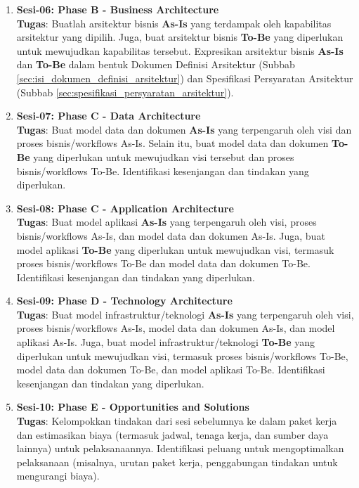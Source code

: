 \begin{enumerate}
	\item \textbf{Sesi-06: Phase B - Business Architecture} \\
	\textbf{Tugas}: Buatlah arsitektur bisnis \textbf{As-Is} yang terdampak oleh kapabilitas arsitektur yang dipilih. Juga, buat arsitektur bisnis \textbf{To-Be} yang diperlukan untuk mewujudkan kapabilitas tersebut. 
	Expresikan arsitektur bisnis \textbf{As-Is} dan \textbf{To-Be} dalam bentuk Dokumen Definisi Arsitektur (Subbab \ref{sec:isi_dokumen_definisi_arsitektur}) dan Spesifikasi Persyaratan Arsitektur (Subbab \ref{sec:spesifikasi_persyaratan_arsitektur}).
	
	\item \textbf{Sesi-07: Phase C - Data Architecture} \\
	\textbf{Tugas}: Buat model data dan dokumen \textbf{As-Is} yang terpengaruh oleh visi dan proses bisnis/workflows As-Is. Selain itu, buat model data dan dokumen \textbf{To-Be} yang diperlukan untuk mewujudkan visi tersebut dan proses bisnis/workflows To-Be. Identifikasi kesenjangan dan tindakan yang diperlukan.
	
	\item \textbf{Sesi-08: Phase C - Application Architecture} \\
	\textbf{Tugas}: Buat model aplikasi \textbf{As-Is} yang terpengaruh oleh visi, proses bisnis/workflows As-Is, dan model data dan dokumen As-Is. Juga, buat model aplikasi \textbf{To-Be} yang diperlukan untuk mewujudkan visi, termasuk proses bisnis/workflows To-Be dan model data dan dokumen To-Be. Identifikasi kesenjangan dan tindakan yang diperlukan.
	
	\item \textbf{Sesi-09: Phase D - Technology Architecture} \\
	\textbf{Tugas}: Buat model infrastruktur/teknologi \textbf{As-Is} yang terpengaruh oleh visi, proses bisnis/workflows As-Is, model data dan dokumen As-Is, dan model aplikasi As-Is. Juga, buat model infrastruktur/teknologi \textbf{To-Be} yang diperlukan untuk mewujudkan visi, termasuk proses bisnis/workflows To-Be, model data dan dokumen To-Be, dan model aplikasi To-Be. Identifikasi kesenjangan dan tindakan yang diperlukan.
	
	\item \textbf{Sesi-10: Phase E - Opportunities and Solutions} \\
	\textbf{Tugas}: Kelompokkan tindakan dari sesi sebelumnya ke dalam paket kerja dan estimasikan biaya (termasuk jadwal, tenaga kerja, dan sumber daya lainnya) untuk pelaksanaannya. Identifikasi peluang untuk mengoptimalkan pelaksanaan (misalnya, urutan paket kerja, penggabungan tindakan untuk mengurangi biaya).
	

\end{enumerate}
